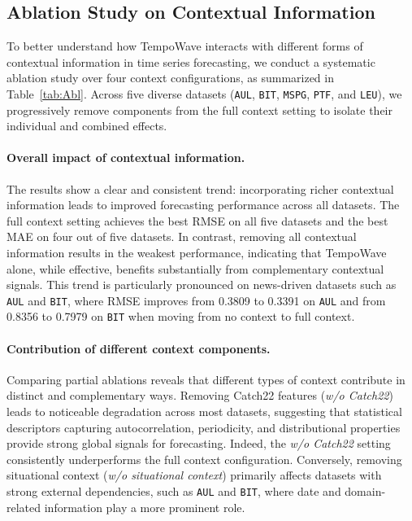 \documentclass{article}
\begin{document}
\subsection{Ablation Study on Contextual Information}
\label{sec:ablation_context}

To better understand how TempoWave interacts with different forms of contextual information in time series forecasting, we conduct a systematic ablation study over four context configurations, as summarized in Table~\ref{tab:Abl}.
Across five diverse datasets (\texttt{AUL}, \texttt{BIT}, \texttt{MSPG}, \texttt{PTF}, and \texttt{LEU}), we progressively remove components from the full context setting to isolate their individual and combined effects.

\paragraph{Overall impact of contextual information.}
The results show a clear and consistent trend: incorporating richer contextual information leads to improved forecasting performance across all datasets.
The full context setting achieves the best RMSE on all five datasets and the best MAE on four out of five datasets.
In contrast, removing all contextual information results in the weakest performance, indicating that TempoWave alone, while effective, benefits substantially from complementary contextual signals.
This trend is particularly pronounced on news-driven datasets such as \texttt{AUL} and \texttt{BIT}, where RMSE improves from 0.3809 to 0.3391 on \texttt{AUL} and from 0.8356 to 0.7979 on \texttt{BIT} when moving from no context to full context.

\paragraph{Contribution of different context components.}
Comparing partial ablations reveals that different types of context contribute in distinct and complementary ways.
Removing Catch22 features (\emph{w/o Catch22}) leads to noticeable degradation across most datasets, suggesting that statistical descriptors capturing autocorrelation, periodicity, and distributional properties provide strong global signals for forecasting.
Indeed, the \emph{w/o Catch22} setting consistently underperforms the full context configuration.
Conversely, removing situational context (\emph{w/o situational context}) primarily affects datasets with strong external dependencies, such as \texttt{AUL} and \texttt{BIT}, where date and domain-related information play a more prominent role.
\end{document}
